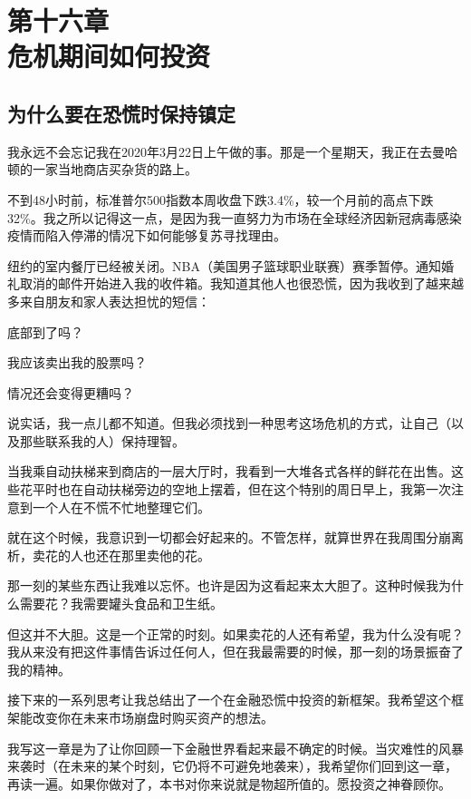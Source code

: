 \section[第十六章\q 危机期间如何投资]{第十六章\\ 危机期间如何投资}
\renewcommand{\bookchapter}{16}
\setcounter{figure}{0}
\setcounter{table}{0}
\subsection{为什么要在恐慌时保持镇定}

我永远不会忘记我在2020年3月22日上午做的事。那是一个星期天，我正在去曼哈顿的一家当地商店买杂货的路上。

不到48小时前，标准普尔500指数本周收盘下跌3.4\%，较一个月前的高点下跌32\%。我之所以记得这一点，是因为我一直努力为市场在全球经济因新冠病毒感染疫情而陷入停滞的情况下如何能够复苏寻找理由。

纽约的室内餐厅已经被关闭。NBA（美国男子篮球职业联赛）赛季暂停。通知婚礼取消的邮件开始进入我的收件箱。我知道其他人也很恐慌，因为我收到了越来越多来自朋友和家人表达担忧的短信：

底部到了吗？

我应该卖出我的股票吗？

情况还会变得更糟吗？

说实话，我一点儿都不知道。但我必须找到一种思考这场危机的方式，让自己（以及那些联系我的人）保持理智。

当我乘自动扶梯来到商店的一层大厅时，我看到一大堆各式各样的鲜花在出售。这些花平时也在自动扶梯旁边的空地上摆着，但在这个特别的周日早上，我第一次注意到一个人在不慌不忙地整理它们。

就在这个时候，我意识到一切都会好起来的。不管怎样，就算世界在我周围分崩离析，卖花的人也还在那里卖他的花。

那一刻的某些东西让我难以忘怀。也许是因为这看起来太大胆了。这种时候我为什么需要花？我需要罐头食品和卫生纸。

但这并不大胆。这是一个正常的时刻。如果卖花的人还有希望，我为什么没有呢？我从来没有把这件事情告诉过任何人，但在我最需要的时候，那一刻的场景振奋了我的精神。

接下来的一系列思考让我总结出了一个在金融恐慌中投资的新框架。我希望这个框架能改变你在未来市场崩盘时购买资产的想法。

我写这一章是为了让你回顾一下金融世界看起来最不确定的时候。当灾难性的风暴来袭时（在未来的某个时刻，它仍将不可避免地袭来），我希望你们回到这一章，再读一遍。如果你做对了，本书对你来说就是物超所值的。愿投资之神眷顾你。

